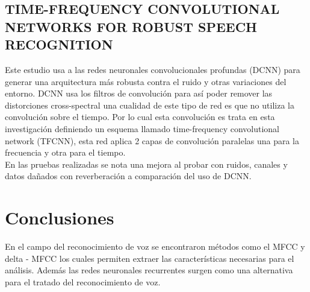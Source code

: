 \subsection{TIME-FREQUENCY CONVOLUTIONAL NETWORKS FOR ROBUST SPEECH RECOGNITION}
Este estudio usa a las redes neuronales convolucionales profundas (DCNN) para generar una arquitectura más robusta contra el ruido y otras variaciones del entorno. DCNN usa los filtros de convolución para así poder remover las distorciones cross-spectral una cualidad de este tipo de red es que no utiliza la convolución sobre el tiempo. Por lo cual esta convolución es trata en esta investigación definiendo un esquema llamado time-frequency convolutional network (TFCNN), esta red aplica 2 capas de convolución paralelas una para la frecuencia y otra para el tiempo.\\ En las pruebas realizadas se nota una mejora al probar con ruidos, canales y datos dañados con reverberación a comparación del uso de DCNN.
\section{Conclusiones}
En el campo del reconocimiento de voz se encontraron métodos como el MFCC y delta - MFCC los cuales permiten extraer las características necesarias para el análisis. Además las redes neuronales recurrentes surgen como una alternativa para el tratado del reconocimiento de voz.

